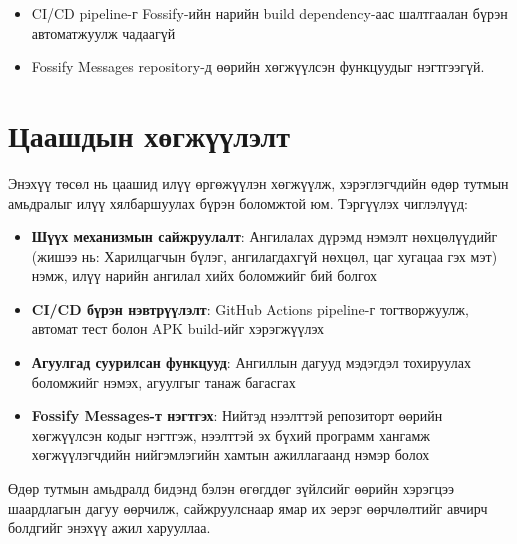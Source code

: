 \begin{itemize}
    \item CI/CD pipeline-г Fossify-ийн нарийн
    build dependency-аас шалтгаалан бүрэн автоматжуулж
    чадаагүй
    \item Fossify Messages repository-д өөрийн хөгжүүлсэн функцуудыг нэгтгээгүй.
\end{itemize}

\section{Цаашдын хөгжүүлэлт}
Энэхүү төсөл нь цаашид илүү өргөжүүлэн хөгжүүлж,
хэрэглэгчдийн өдөр тутмын амьдралыг илүү хялбаршуулах
бүрэн боломжтой юм. Тэргүүлэх чиглэлүүд:

\begin{itemize}
    \item \textbf{Шүүх механизмын сайжруулалт}:
    Ангилалах дүрэмд нэмэлт нөхцөлүүдийг (жишээ нь: Харилцагчын бүлэг, ангилагдахгүй нөхцөл, цаг хугацаа гэх мэт) нэмж, илүү нарийн ангилал хийх боломжийг бий болгох
    \item \textbf{CI/CD бүрэн нэвтрүүлэлт}:
    GitHub Actions pipeline-г тогтворжуулж,
    автомат тест болон APK build-ийг хэрэгжүүлэх
    \item \textbf{Агуулгад суурилсан функцууд}:
    Ангиллын дагууд мэдэгдэл тохируулах боломжийг нэмэх, агуулгыг танаж багасгах
    \item \textbf{Fossify Messages-т нэгтгэх}:
    Нийтэд нээлттэй репозиторт өөрийн хөгжүүлсэн кодыг нэгтгэж,
    нээлттэй эх бүхий программ хангамж хөгжүүлэгчдийн нийгэмлэгийн хамтын ажиллагаанд нэмэр болох
\end{itemize}

Өдөр тутмын амьдралд бидэнд бэлэн өгөгддөг зүйлсийг
өөрийн хэрэгцээ шаардлагын дагуу өөрчилж, сайжруулснаар
ямар их эерэг өөрчлөлтийг авчирч болдгийг энэхүү ажил харууллаа.
